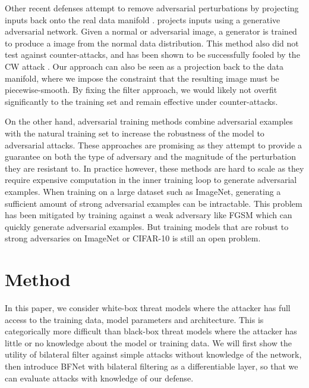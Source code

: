 \documentclass{article} %
\begin{document}
Other recent defenses attempt to remove adversarial perturbations by projecting inputs back onto the real data manifold \citep{meng2017magnet}. \citep{shen2017ape} projects inputs using a generative adversarial network. Given a normal or adversarial image, a generator is trained to produce a image from the normal data distribution. This method also did not test against counter-attacks, and has been shown to be successfully fooled by the CW attack \citep{meng2017magnet}. Our approach can also be seen as a projection back to the data manifold, where we impose the constraint that the resulting image must be piecewise-smooth. By fixing the filter approach, we would likely not overfit significantly to the training set and remain effective under counter-attacks. %
 
On the other hand, adversarial training methods \citep{goodfellow2015explaining,madry2017towards,shaham2018understanding,tramer2017ensemble} combine adversarial examples with the natural training set to increase the robustness of the model to adversarial attacks. These approaches are promising as they attempt to provide a guarantee on both the type of adversary and the magnitude of the perturbation they are resistant to. In practice however, these methods are hard to scale as they require expensive computation in the inner training loop to generate adversarial examples. When training on a large dataset such as ImageNet, generating a sufficient amount of strong adversarial examples can be intractable. This problem has been mitigated by training against a weak adversary like FGSM \citep{tramer2017ensemble} which can quickly generate adversarial examples. But training models that are robust to strong adversaries on ImageNet or CIFAR-10 is still an open problem. 

\section{Method}

In this paper, we consider white-box threat models where the attacker has full access to the training data, model parameters and architecture. This is categorically more difficult than black-box threat models where the attacker has little or no knowledge about the model or training data. We will first show the utility of bilateral filter against simple attacks without knowledge of the network, then introduce BFNet with bilateral filtering as a differentiable layer, so that we can evaluate attacks with knowledge of our defense.
\end{document}
